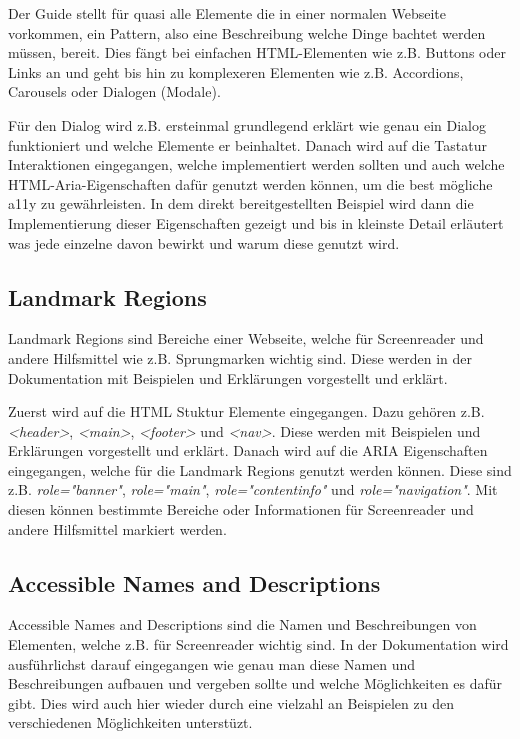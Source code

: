 Der Guide stellt für quasi alle Elemente die in einer normalen Webseite vorkommen, ein Pattern, also eine Beschreibung welche Dinge bachtet werden müssen, bereit. Dies fängt bei einfachen HTML-Elementen wie z.B. Buttons oder Links an und geht bis hin zu komplexeren Elementen wie z.B. Accordions, Carousels oder Dialogen (Modale). \cite{initiative_wai_patterns_nodate}

Für den Dialog wird z.B. ersteinmal grundlegend erklärt wie genau ein Dialog funktioniert und welche Elemente er beinhaltet. Danach wird auf die Tastatur Interaktionen eingegangen, welche implementiert werden sollten und auch welche HTML-Aria-Eigenschaften dafür genutzt werden können, um die best mögliche a11y zu gewährleisten. In dem direkt bereitgestellten Beispiel wird dann die Implementierung dieser Eigenschaften gezeigt und bis in kleinste Detail erläutert was jede einzelne davon bewirkt und warum diese genutzt wird.

\subsection{Landmark Regions}

Landmark Regions sind Bereiche einer Webseite, welche für Screenreader und andere Hilfsmittel wie z.B. Sprungmarken wichtig sind. \cite{initiative_wai_landmark_nodate} Diese werden in der Dokumentation mit Beispielen und Erklärungen vorgestellt und erklärt.

Zuerst wird auf die HTML Stuktur Elemente eingegangen. Dazu gehören z.B. \emph{<header>}, \emph{<main>}, \emph{<footer>} und \emph{<nav>}. Diese werden mit Beispielen und Erklärungen vorgestellt und erklärt. Danach wird auf die ARIA Eigenschaften eingegangen, welche für die Landmark Regions genutzt werden können. Diese sind z.B. \emph{role="banner"}, \emph{role="main"}, \emph{role="contentinfo"} und \emph{role="navigation"}. Mit diesen können bestimmte Bereiche oder Informationen für Screenreader und andere Hilfsmittel markiert werden.

\subsection{Accessible Names and Descriptions}
\label{ssec:research_accessibleNameAndDescriptions}

Accessible Names and Descriptions sind die Namen und Beschreibungen von Elementen, welche z.B. für Screenreader wichtig sind. \cite{initiative_wai_providing_nodate} In der Dokumentation wird ausführlichst darauf eingegangen wie genau man diese Namen und Beschreibungen aufbauen und vergeben sollte und welche Möglichkeiten es dafür gibt. Dies wird auch hier wieder durch eine vielzahl an Beispielen zu den verschiedenen Möglichkeiten unterstüzt.

